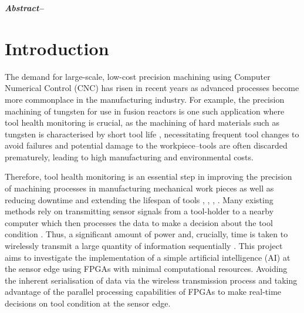 \documentclass[../main.tex]{subfiles}
\begin{document}
\textit{\textbf{Abstract--}}

\section{Introduction}





The demand for large-scale, low-cost precision machining using Computer Numerical Control (CNC) has risen in recent years as advanced processes become more commonplace in the manufacturing industry. For example, the precision machining of tungsten for use in fusion reactors is one such application where tool health monitoring is crucial, as the machining of hard materials such as tungsten is characterised by short tool life \cite{RN18}, necessitating frequent tool changes to avoid failures and potential damage to the workpiece--tools are often discarded prematurely, leading to high manufacturing and environmental costs.


Therefore, tool health monitoring is an essential step in improving the precision of machining processes in manufacturing mechanical work pieces as well as reducing downtime and extending the lifespan of tools \cite{s22010291}, \cite{9843528}, \cite{9462147}, \cite{RN10}. Many existing methods rely on transmitting sensor signals from a tool-holder to a nearby computer which then processes the data to make a decision about the tool condition \cite{RN13}. 
Thus, a significant amount of power and, crucially, time is taken to wirelessly transmit a large quantity of information sequentially \cite{RN1}. %
This project aims to investigate the implementation of a simple artificial intelligence (AI) at the sensor edge using FPGAs with minimal computational resources. Avoiding the inherent serialisation of data via the wireless transmission process and taking advantage of the parallel processing capabilities of FPGAs to make real-time decisions on tool condition at the sensor edge.
\end{document}
